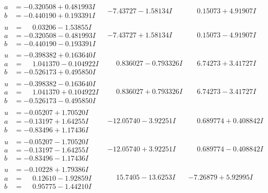 \documentclass[1p]{elsarticle_modified}
\theoremstyle{definition}
\begin{document}
$$\begin{array}{c|c|c}
\begin{aligned}
a &= -0.320508 + 0.481993 I \\
b &= -0.440190 + 0.193391 I\end{aligned}
 & -7.43727 - 1.58134 I & \phantom{-}0.15073 + 4.91907 I \\ \hline\begin{aligned}
u &= \phantom{-}0.03206 - 1.53855 I \\
a &= -0.320508 - 0.481993 I \\
b &= -0.440190 - 0.193391 I\end{aligned}
 & -7.43727 + 1.58134 I & \phantom{-}0.15073 - 4.91907 I \\ \hline\begin{aligned}
u &= -0.398382 + 0.163640 I \\
a &= \phantom{-}1.041370 - 0.104922 I \\
b &= -0.526173 + 0.495850 I\end{aligned}
 & \phantom{-}0.836027 - 0.793326 I & \phantom{-}6.74273 + 3.41727 I \\ \hline\begin{aligned}
u &= -0.398382 - 0.163640 I \\
a &= \phantom{-}1.041370 + 0.104922 I \\
b &= -0.526173 - 0.495850 I\end{aligned}
 & \phantom{-}0.836027 + 0.793326 I & \phantom{-}6.74273 - 3.41727 I \\ \hline\begin{aligned}
u &= -0.05207 + 1.70520 I \\
a &= -0.13197 + 1.64255 I \\
b &= -0.83496 + 1.17436 I\end{aligned}
 & -12.05740 - 3.92251 I & \phantom{-}0.689774 + 0.408842 I \\ \hline\begin{aligned}
u &= -0.05207 - 1.70520 I \\
a &= -0.13197 - 1.64255 I \\
b &= -0.83496 - 1.17436 I\end{aligned}
 & -12.05740 + 3.92251 I & \phantom{-}0.689774 - 0.408842 I \\ \hline\begin{aligned}
u &= -0.10228 + 1.79386 I \\
a &= \phantom{-}0.12610 - 1.92859 I \\
b &= \phantom{-}0.95775 - 1.44210 I\end{aligned}
 & \phantom{-}15.7405 - 13.6253 I & -7.26879 + 5.92995 I \\ \hline\begin{aligned}

\end{aligned}
\end{array}$$
\end{document}
